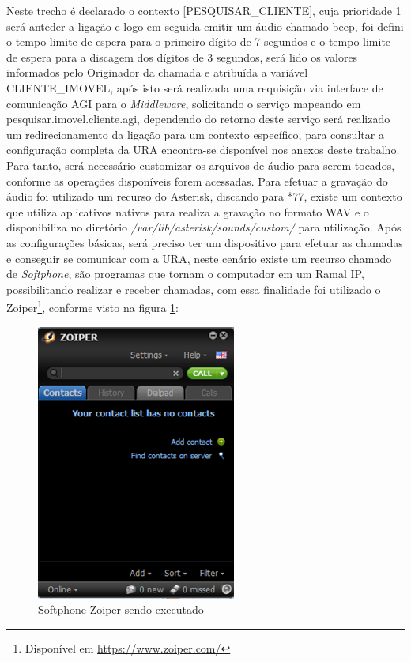 Neste trecho é declarado o contexto [PESQUISAR\_CLIENTE], cuja prioridade 1 será anteder a ligação e logo em seguida emitir um áudio chamado beep, foi defini o tempo limite de espera para o primeiro dígito de 7 segundos e o tempo limite de espera para a discagem dos dígitos de 3 segundos, será lido os valores informados pelo Originador da chamada e atribuída a variável CLIENTE\_IMOVEL, após isto será realizada uma requisição via interface de comunicação  AGI para o \textit{Middleware}, solicitando o serviço mapeando em pesquisar.imovel.cliente.agi, dependendo do retorno deste serviço será realizado um redirecionamento da ligação para um contexto específico, para consultar a configuração completa da URA encontra-se disponível nos anexos deste trabalho.
Para tanto, será necessário customizar os arquivos de áudio para serem tocados, conforme as operações disponíveis forem acessadas. Para efetuar a gravação do áudio foi utilizado um recurso do Asterisk, discando para *77, existe um contexto que utiliza aplicativos nativos para realiza a gravação no formato WAV e o disponibiliza no diretório \textit{/var/lib/asterisk/sounds/custom/} para utilização.
Após as configurações básicas, será preciso ter um dispositivo para efetuar as chamadas e conseguir se comunicar com a URA, neste cenário existe um recurso chamado de \textit{Softphone}, são programas que tornam o computador em um Ramal IP, possibilitando realizar e receber chamadas, com essa finalidade foi utilizado o Zoiper\footnote{Disponível em \url{https://www.zoiper.com/}}, conforme visto na figura \ref{figura:zoiper}:

\begin{figure}[!htb]
	\centering
	\caption{Softphone Zoiper sendo executado}	
	\label{figura:zoiper}
	\includegraphics{figuras/zoiper.png}
\end{figure}


